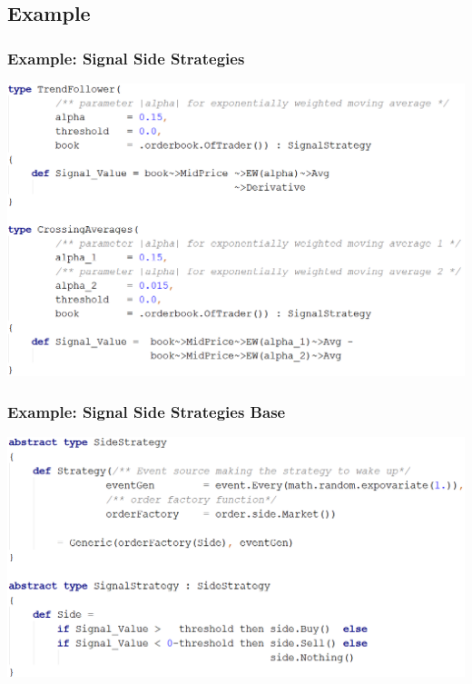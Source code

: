\documentclass{beamer}
\begin{document}
\subsection{Example}
\begin{frame}
\frametitle{Example: Signal Side Strategies}
\includegraphics[width=1\linewidth]{side_strategies.png}
\end{frame}
\begin{frame}
\frametitle{Example: Signal Side Strategies Base}
\includegraphics[width=1\linewidth]{side_strategies_base.png}
\end{frame}
\end{document}
